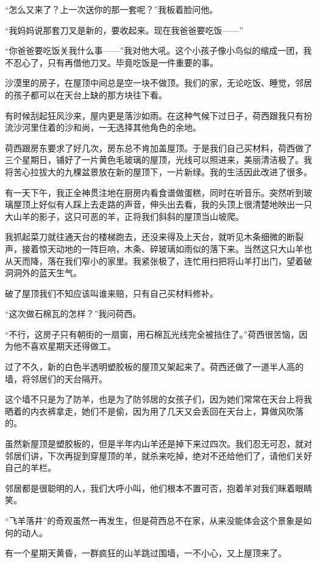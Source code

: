 \par “怎么又来了？上一次送你的那一套呢？”我板着脸问他。
\par “我妈妈说那套刀叉是新的，要收起来。现在我爸爸要吃饭——”
\par “你爸爸要吃饭关我什么事——”我对他大吼。这个小孩子像小鸟似的缩成一团，我不忍心了，只有再借他刀叉。毕竟吃饭是一件重要的事。
\par 沙漠里的房子，在屋顶中间总是空一块不做顶。我们的家，无论吃饭、睡觉，邻居的孩子都可以在天台上缺的那方块往下看。
\par 有时候刮起狂风沙来，屋内更是落沙如雨。在这种气候下过日子，荷西跟我只有扮流沙河里住着的沙和尚，一无选择其他角色的余地。
\par 荷西跟房东要求了好几次，房东总不肯加盖屋顶。于是我们自己买材料，荷西做了三个星期日，铺好了一片黄色毛玻璃的屋顶，光线可以照进来，美丽清洁极了。我将苦心拉拔大的九棵盆景放在新的屋顶下，一片新绿。我的生活因此改进了很多。
\par 有一天下午，我正全神贯注地在厨房内看食谱做蛋糕，同时在听音乐。突然听到玻璃屋顶上好似有人踩上去走路的声音，伸头出去看，我的头顶上很清楚地映出一只大山羊的影子，这只可恶的羊，正将我们斜斜的屋顶当山坡爬。
\par 我抓起菜刀就往通天台的楼梯跑去，还没来得及上天台，就听见木条细微的断裂声，接着惊天动地的一阵巨响，木条、碎玻璃如雨似的落下来。当然这只大山羊也从天而降，落在我们窄小的家里。我紧张极了，连忙用扫把将山羊打出门，望着破洞洞外的蓝天生气。
\par 破了屋顶我们不知应该叫谁来赔，只有自己买材料修补。
\par “这次做石棉瓦的怎样？”我问荷西。
\par “不行，这房子只有朝街的一扇窗，用石棉瓦光线完全被挡住了。”荷西很苦恼，因为他不喜欢星期天还得做工。
\par 过了不久，新的白色半透明塑胶板的屋顶又架起来了。荷西还做了一道半人高的墙，将邻居们的天台隔开。
\par 这个墙不只是为了防羊，也是为了防邻居的女孩子们，因为她们常常在天台上将我晒着的内衣裤拿走，她们不是偷，因为用了几天又会丢回在天台上，算做风吹落的。
\par 虽然新屋顶是塑胶板的，但是半年内山羊还是掉下来过四次。我们忍无可忍，就对邻居们讲，下次再捉到穿屋顶的羊，就杀来吃掉，绝对不还给他们了，请他们关好自己的羊栏。
\par 邻居都是很聪明的人，我们大呼小叫，他们根本不置可否，抱着羊对我们眯着眼睛笑。
\par “飞羊落井”的奇观虽然一再发生，但是荷西总不在家，从来没能体会这个景象是如何的动人。
\par 有一个星期天黄昏，一群疯狂的山羊跳过围墙，一不小心，又上屋顶来了。
